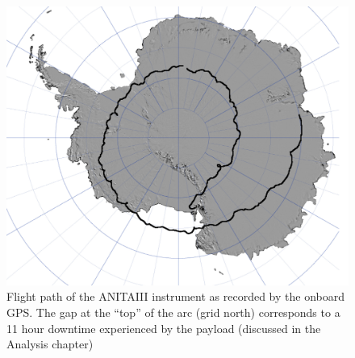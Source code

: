 \begin{figure}
\centering
	\includegraphics[width=\textwidth]{figures/A3FlightPath}
	\caption{Flight path of the ANITAIII instrument as recorded by the onboard GPS.  The gap at the ``top'' of the arc (grid north) corresponds to a 11 hour downtime experienced by the payload (discussed in the Analysis chapter)}
	\label{fig:A3FlightPath}
\end{figure}


		

		
		
